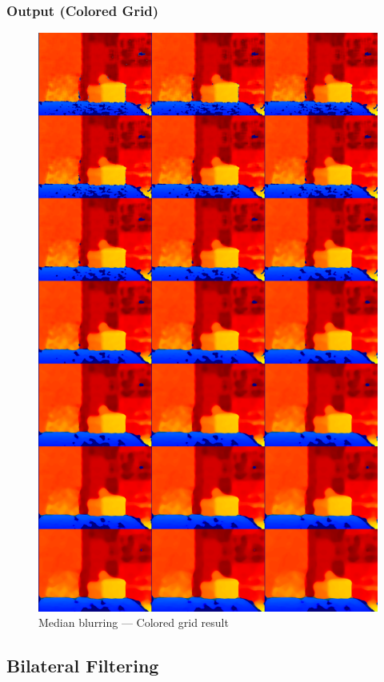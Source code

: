 \documentclass[a4paper,11pt]{article}
\begin{document}
	\subsubsection*{Output (Colored Grid)}
	\begin{figure}[H]
		\centering
		\includegraphics[width=\textwidth,height=0.9\textheight,keepaspectratio]{Images/06_median_colored_grid.png}
		\caption{Median blurring — Colored grid result}
	\end{figure}
	\clearpage
	
	\subsection{Bilateral Filtering}
\end{document}
